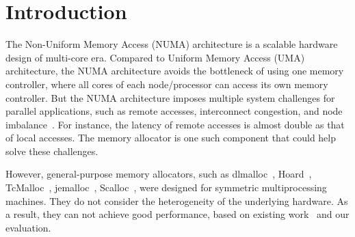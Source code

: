 
\section{Introduction}
\label{sec:intro}

The Non-Uniform Memory Access (NUMA) architecture is a scalable hardware design of multi-core era. Compared to Uniform Memory Access (UMA) architecture, the NUMA architecture avoids the bottleneck of using one memory controller, where all cores of each node/processor can access its own memory controller. But the NUMA architecture imposes multiple system challenges for parallel applications, such as remote accesses, interconnect congestion, and node imbalance~\cite{Blagodurov:2011:CNC:2002181.2002182}. For instance, the latency of remote accesses is almost double as that of local accesses. The memory allocator is one such component that could help solve these challenges.   

However, general-purpose memory allocators, such as dlmalloc~\cite{dlmalloc},  Hoard~\cite{Hoard}, TcMalloc~\cite{tcmalloc}, jemalloc~\cite{jemalloc}, Scalloc~\cite{Scalloc}, were designed for symmetric multiprocessing machines. They do not consider the heterogeneity of the underlying hardware. As a result, they can not achieve good performance, based on existing work~\cite{tcmallocnew, yang2019jarena} and our evaluation. 

